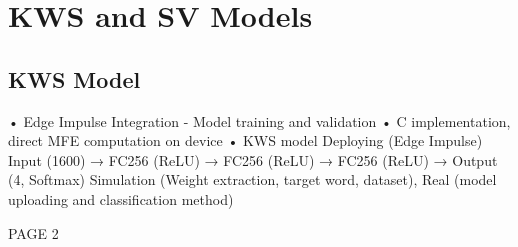 \chapter{KWS and SV Models}
\label{cha:training} 
\section{KWS Model}
\label{sec:kws deployment}
• Edge Impulse Integration - Model training and validation\newline
• C implementation, direct MFE computation on device\newline
• KWS model Deploying (Edge Impulse)\newline
Input (1600) → FC256 (ReLU) → FC256 (ReLU) → FC256 (ReLU) → Output (4, Softmax)\newline
Simulation (Weight extraction, target word, dataset), Real (model uploading and classification method)\newline

\newpage
PAGE 2
\newpage
